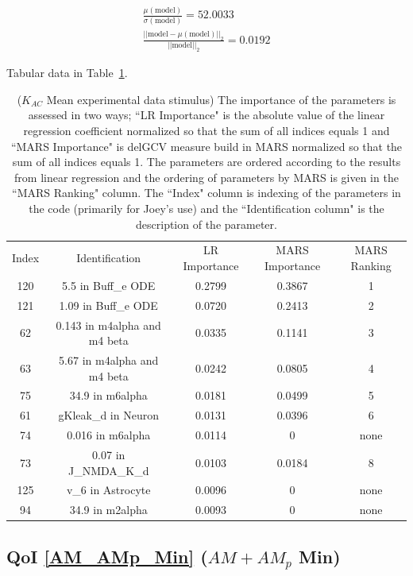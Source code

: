\documentclass[12pt]{article}
\numberwithin{equation}{section}
\begin{document}
\begin{eqnarray*}
\frac{\mu(\text{model})}{\sigma(\text{model})} = 52.0033\\
\frac{\vert \vert \text{model}-\mu(\text{model}) \vert \vert_2 }{\vert \vert \text{model}\vert \vert_2 } = 0.0192
\end{eqnarray*}

Tabular data in Table~\ref{qoi_K_AC_Mean_ex}.

\begin{table}[h]
\centering
\begin{tabular}{ccccc}
Index & Identification & LR Importance & MARS Importance & MARS Ranking \\
120 & 5.5 in Buff\_e ODE &  0.2799 & 0.3867 & 1\\
121 & 1.09 in Buff\_e ODE & 0.0720 & 0.2413 & 2\\
62 & 0.143 in m4alpha and m4 beta & 0.0335 & 0.1141 & 3\\
63 &   5.67 in m4alpha and m4 beta &  0.0242 & 0.0805 & 4\\
75 & 34.9 in m6alpha & 0.0181 & 0.0499 & 5\\
61 & gKleak\_d in Neuron & 0.0131 & 0.0396 & 6\\
74 & 0.016 in m6alpha & 0.0114 & 0 & none\\
73 & 0.07 in J\_NMDA\_K\_d & 0.0103 & 0.0184 & 8\\
125 & v\_6 in Astrocyte & 0.0096 & 0 & none\\
94 & 34.9 in m2alpha  & 0.0093 & 0 & none\\
\end{tabular}
\caption{($K_{AC}$ Mean experimental data stimulus) The importance of the parameters is assessed in two ways; ``LR Importance" is the absolute value of the linear regression coefficient normalized so that the sum of all indices equals 1 and ``MARS Importance" is delGCV measure build in MARS normalized so that the sum of all indices equals 1. The parameters are ordered according to the results from linear regression and the ordering of parameters by MARS is given in the ``MARS Ranking" column. The ``Index" column is indexing of the parameters in the code (primarily for Joey's use) and the ``Identification column" is the description of the parameter.}
\label{qoi_K_AC_Mean_ex}
\end{table}

\newpage
\subsection{QoI \eqref{AM_AMp_Min} ($AM+AM_p$ Min)}
\end{document}
